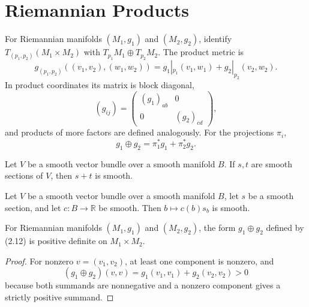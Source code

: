 \section{Riemannian Products}

For Riemannian manifolds $(M_1,g_1)$ and $(M_2,g_2)$, identify
$T_{(p_1,p_2)}(M_1\times M_2)$ with
$T_{p_1}M_1\oplus T_{p_2}M_2$. The product metric is
\begin{equation}
g_{(p_1,p_2)}((v_1,v_2),(w_1,w_2))=g_1|_{p_1}(v_1,w_1)+g_2|_{p_2}(v_2,w_2). \tag{2.12}
\end{equation}
In product coordinates its matrix is block diagonal,
\[
(g_{ij})=\begin{pmatrix}(g_1)_{ab}&0\\0&(g_2)_{cd}\end{pmatrix},
\]
and products of more factors are defined analogously. For the projections $\pi_i$,
\begin{equation}
g_1\oplus g_2=\pi_1^*g_1+\pi_2^*g_2. \tag{2.12'}
\end{equation}

\begin{lemma}
\label{lem:smooth-tensor-field-add}
\mathlibok
Let $V$ be a smooth vector bundle over a smooth manifold $B$. If $s,t$ are smooth sections of $V$, then $s+t$ is smooth.
\end{lemma}

\begin{lemma}
\label{lem:smooth-tensor-field-smul}
\mathlibok
Let $V$ be a smooth vector bundle over a smooth manifold $B$, let $s$ be a smooth section, and let $c:B\to\mathbb R$ be smooth. Then $b\mapsto c(b)s_b$ is smooth.
\end{lemma}

\begin{lemma}
\label{lem:product-form-positive-definite}
\leanok
{}
For Riemannian manifolds $(M_1,g_1)$ and $(M_2,g_2)$, the form $g_1\oplus g_2$ defined by (2.12) is positive definite on $M_1\times M_2$.
\end{lemma}

\begin{proof}
\leanok
{}
\sketch For nonzero $v=(v_1,v_2)$, at least one component is nonzero, and
\[
(g_1\oplus g_2)(v,v)=g_1(v_1,v_1)+g_2(v_2,v_2)>0
\]
because both summands are nonnegative and a nonzero component gives a strictly positive summand.
\end{proof}

